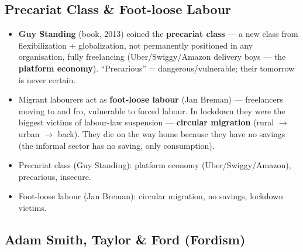 \sectiondivider

\subsection{Precariat Class \& Foot-loose Labour}

\begin{KeyConcept}
\begin{itemize}
    \item \textbf{Guy Standing} (book, 2013) coined the \textbf{precariat class} --- a new class from flexibilization + globalization, not permanently positioned in any organisation, fully freelancing (Uber/Swiggy/Amazon delivery boys --- the \textbf{platform economy}). ``Precarious'' = dangerous/vulnerable; their tomorrow is never certain.
\end{itemize}
\end{KeyConcept}

\begin{KeyConcept}
\begin{itemize}
    \item Migrant labourers act as \textbf{foot-loose labour} (Jan Breman) --- freelancers moving to and fro, vulnerable to forced labour. In lockdown they were the biggest victims of labour-law suspension --- \textbf{circular migration} (rural $\rightarrow$ urban $\rightarrow$ back). They die on the way home because they have no savings (the informal sector has no saving, only consumption).
\end{itemize}
\end{KeyConcept}

\begin{QuickRevision}
\begin{itemize}
    \item Precariat class (Guy Standing): platform economy (Uber/Swiggy/Amazon), precarious, insecure.
    \item Foot-loose labour (Jan Breman): circular migration, no savings, lockdown victims.
\end{itemize}
\end{QuickRevision}

\sectiondivider

\subsection{Adam Smith, Taylor \& Ford (Fordism)}

